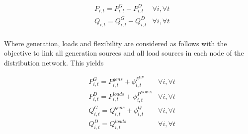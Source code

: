 \begin{subequations}
\begin{align*}
& P_{i,t} = P_{i,t}^{G} - P_{i,t}^{D}   & \forall i,\forall t \\
& Q_{i,t} = Q_{i,t}^{G} - Q_{i,t}^{D}   & \forall i,\forall t \\
\end{align*}
\end{subequations}

Where generation, loads and flexibility are considered as follows with the objective to link all generation sources and all load sources in each node of the distribution network. This yields 

\begin{subequations}
\begin{align*}
& P_{i,t}^{G} = P_{i,t}^{gens} + \phi_{i,t}^{P^{UP}}    & \forall i,\forall t \\
& P_{i,t}^{D} = P_{i,t}^{loads} + \phi_{i,t}^{P^{DOWN}} & \forall i,\forall t \\
& Q_{i,t}^{G} = Q_{i,t}^{gens} + \phi_{i,t}^{Q}    & \forall i,\forall t\\
& Q_{i,t}^{D} = Q_{i,t}^{loads}  & \forall i,\forall t 
\end{align*}
\end{subequations}

%

